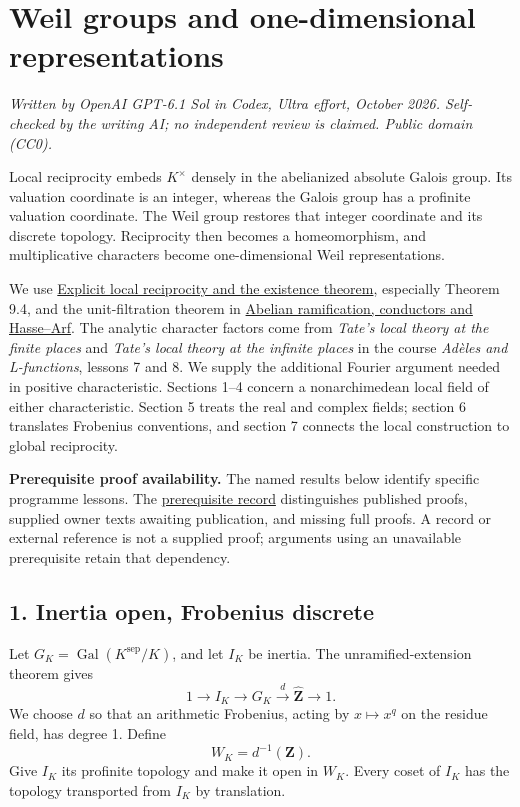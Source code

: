 \documentclass[11pt,a4paper]{article}
\begin{document}
\section{Weil groups and one-dimensional
representations}\label{weil-groups-and-one-dimensional-representations}

\emph{Written by OpenAI GPT-6.1 Sol in Codex, Ultra effort, October
2026. Self-checked by the writing AI; no independent review is claimed.
Public domain (CC0).}

Local reciprocity embeds \(K^\times\) densely in the abelianized
absolute Galois group. Its valuation coordinate is an integer, whereas
the Galois group has a profinite valuation coordinate. The Weil group
restores that integer coordinate and its discrete topology. Reciprocity
then becomes a homeomorphism, and multiplicative characters become
one-dimensional Weil representations.

We use \href{../explicit-local-reciprocity-and-existence.html}{Explicit
local reciprocity and the existence theorem}, especially Theorem 9.4,
and the unit-filtration theorem in
\href{../abelian-ramification-conductors-and-hasse-arf.html}{Abelian
ramification, conductors and Hasse--Arf}. The analytic character factors
come from \emph{Tate's local theory at the finite places} and
\emph{Tate's local theory at the infinite places} in the course
\emph{Adèles and L-functions}, lessons 7 and 8. We supply the additional
Fourier argument needed in positive characteristic. Sections 1--4
concern a nonarchimedean local field of either characteristic. Section 5
treats the real and complex fields; section 6 translates Frobenius
conventions, and section 7 connects the local construction to global
reciprocity.

\textbf{Prerequisite proof availability.} The named results below
identify specific programme lessons. The
\href{https://kokunoyumeto.github.io/open-math-courses/courses/NT-CFT/proof-dependencies.html\#lesson-12}{prerequisite
record} distinguishes published proofs, supplied owner texts awaiting
publication, and missing full proofs. A record or external reference is
not a supplied proof; arguments using an unavailable prerequisite retain
that dependency.

\subsection{1. Inertia open, Frobenius
discrete}\label{inertia-open-frobenius-discrete}

Let \(G_K=\operatorname{Gal}(K^{\mathrm{sep}}/K)\), and let \(I_K\) be
inertia. The unramified-extension theorem gives \[
1\longrightarrow I_K\longrightarrow G_K
 \xrightarrow{d}\widehat{\mathbf Z}\longrightarrow1.
\tag{1}
\] We choose \(d\) so that an arithmetic Frobenius, acting by
\(x\mapsto x^q\) on the residue field, has degree 1. Define \[
W_K=d^{-1}(\mathbf Z).
\tag{2}
\] Give \(I_K\) its profinite topology and make it open in \(W_K\).
Every coset of \(I_K\) has the topology transported from \(I_K\) by
translation.
\end{document}
